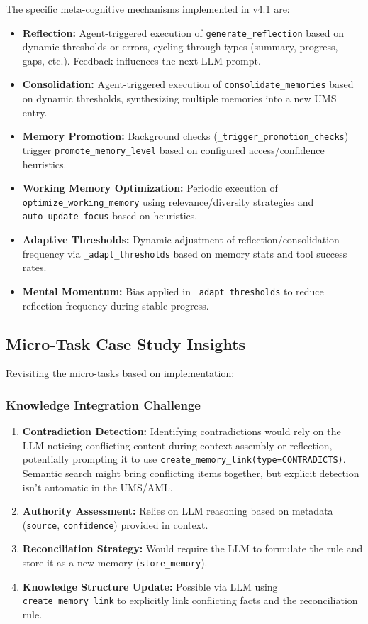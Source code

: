 \documentclass[12pt,a4paper]{article}
\newcommand{\code}[1]{\nolinkurl{#1}}
\begin{document}
The specific meta-cognitive mechanisms implemented in v4.1 are:
\begin{itemize}
    \item \textbf{Reflection:} Agent-triggered execution of \code{generate\_reflection} based on dynamic thresholds or errors, cycling through types (summary, progress, gaps, etc.). Feedback influences the next LLM prompt.
    \item \textbf{Consolidation:} Agent-triggered execution of \code{consolidate\_memories} based on dynamic thresholds, synthesizing multiple memories into a new UMS entry.
    \item \textbf{Memory Promotion:} Background checks (\code{\_trigger\_promotion\_checks}) trigger \code{promote\_memory\_level} based on configured access/confidence heuristics.
    \item \textbf{Working Memory Optimization:} Periodic execution of \code{optimize\_working\_memory} using relevance/diversity strategies and \code{auto\_update\_focus} based on heuristics.
    \item \textbf{Adaptive Thresholds:} Dynamic adjustment of reflection/consolidation frequency via \code{\_adapt\_thresholds} based on memory stats and tool success rates.
    \item \textbf{Mental Momentum:} Bias applied in \code{\_adapt\_thresholds} to reduce reflection frequency during stable progress.
\end{itemize}

\subsection{Micro-Task Case Study Insights}

Revisiting the micro-tasks based on implementation:
\subsubsection{Knowledge Integration Challenge}
\begin{enumerate}
    \item \textbf{Contradiction Detection:} Identifying contradictions would rely on the LLM noticing conflicting content during context assembly or reflection, potentially prompting it to use \code{create\_memory\_link(type=CONTRADICTS)}. Semantic search might bring conflicting items together, but explicit detection isn't automatic in the UMS/AML.
    \item \textbf{Authority Assessment:} Relies on LLM reasoning based on metadata (\code{source}, \code{confidence}) provided in context.
    \item \textbf{Reconciliation Strategy:} Would require the LLM to formulate the rule and store it as a new memory (\code{store\_memory}).
    \item \textbf{Knowledge Structure Update:} Possible via LLM using \code{create\_memory\_link} to explicitly link conflicting facts and the reconciliation rule.
\end{enumerate}
\end{document}

